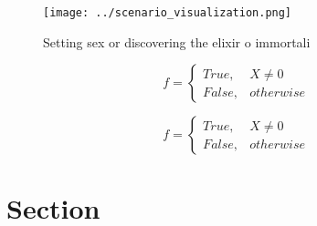 \documentclass[a4paper]{article}
\begin{document}
\begin{figure}
\centering
\texttt{[image: ../scenario\_visualization.png]}
\caption{Setting sex or discovering the elixir o immortali
}
\end{figure}
 
\begin{equation}   f =
\begin{cases} True, & X \neq 0\\
False, & otherwise
\end{cases}
\end{equation}

\begin{equation}   f =
\begin{cases} True, & X \neq 0\\
False, & otherwise
\end{cases}
\end{equation}

\section{Section}
\end{document}
